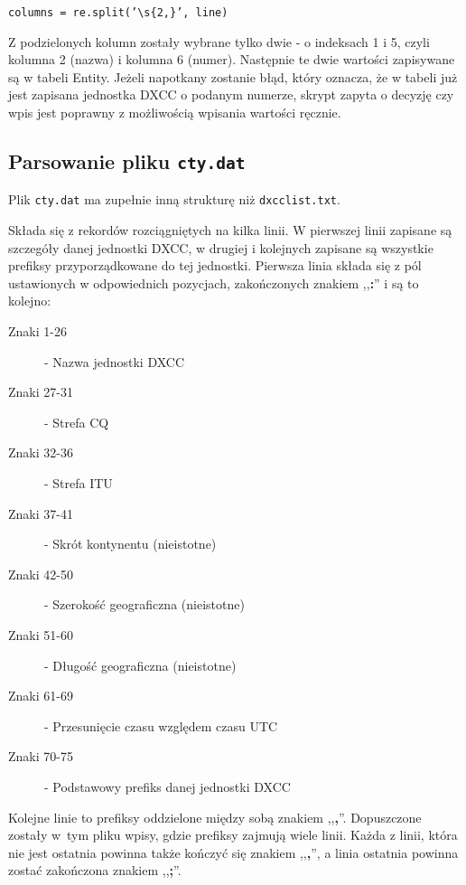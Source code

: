 \documentclass[]{mgr}
\begin{document}
            \texttt{columns = re.split('\textbackslash s\{2,\}', line)}

            \noindent Z podzielonych kolumn zostały wybrane tylko dwie - o indeksach 1 i 5, czyli kolumna 2 (nazwa) i kolumna 6 (numer). Następnie te dwie wartości zapisywane są w tabeli Entity. Jeżeli napotkany zostanie błąd, który oznacza, że w tabeli już jest zapisana jednostka DXCC o podanym numerze, skrypt zapyta o decyzję czy wpis jest poprawny z możliwością wpisania wartości ręcznie.

            \subsection{Parsowanie pliku \texttt{cty.dat}}
            Plik \texttt{cty.dat} ma zupełnie inną strukturę niż \texttt{dxcclist.txt}.

            

            Składa się z rekordów rozciągniętych na kilka linii. W pierwszej linii zapisane są szczegóły danej jednostki DXCC, w drugiej i kolejnych zapisane są wszystkie prefiksy przyporządkowane do tej jednostki. Pierwsza linia składa się z pól ustawionych w odpowiednich pozycjach, zakończonych znakiem ,,\textbf{:}'' i są to kolejno:
            \begin{description}
                \item[Znaki 1-26] - Nazwa jednostki DXCC
                \item[Znaki 27-31] - Strefa CQ
                \item[Znaki 32-36] - Strefa ITU
                \item[Znaki 37-41] - Skrót kontynentu (nieistotne)
                \item[Znaki 42-50] - Szerokość geograficzna (nieistotne)
                \item[Znaki 51-60] - Długość geograficzna (nieistotne)
                \item[Znaki 61-69] - Przesunięcie czasu względem czasu UTC
                \item[Znaki 70-75] - Podstawowy prefiks danej jednostki DXCC
            \end{description}

            Kolejne linie to prefiksy oddzielone między sobą znakiem ,,\textbf{,}''. Dopuszczone zostały w~tym pliku wpisy, gdzie prefiksy zajmują wiele linii. Każda z linii, która nie jest ostatnia powinna także kończyć się znakiem ,,\textbf{,}'', a linia ostatnia powinna zostać zakończona znakiem ,,\textbf{;}''.
\end{document}
